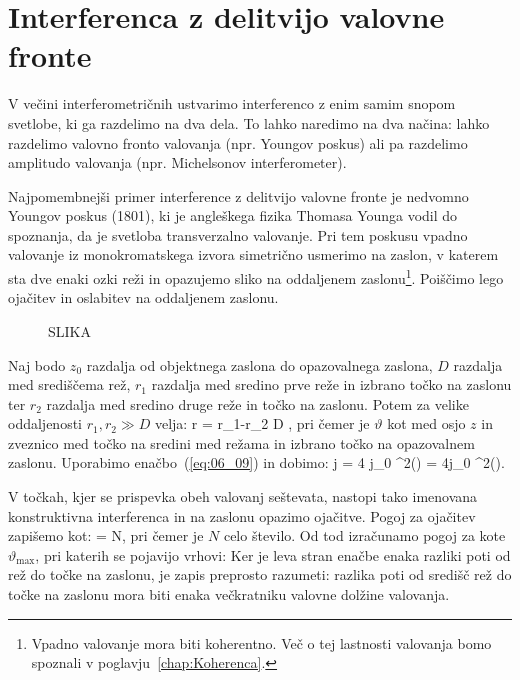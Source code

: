 \section{Interferenca z delitvijo valovne fronte}
V večini interferometričnih ustvarimo interferenco z enim samim snopom svetlobe, 
ki ga razdelimo na dva dela. To lahko naredimo na dva načina: lahko razdelimo
valovno fronto valovanja (npr. Youngov poskus) ali pa razdelimo amplitudo
valovanja (npr. Michelsonov interferometer). 

Najpomembnejši primer interference z delitvijo valovne fronte je nedvomno
Youngov poskus (1801), ki je angleškega fizika Thomasa Younga vodil do spoznanja,
da je svetloba transverzalno valovanje. Pri tem poskusu vpadno valovanje iz 
monokromatskega izvora simetrično usmerimo na zaslon, v katerem sta dve enaki ozki
reži in opazujemo sliko na oddaljenem zaslonu\footnote{Vpadno valovanje mora biti 
koherentno. Več o tej lastnosti valovanja 
bomo spoznali v poglavju~\ref{chap:Koherenca}.}. Poiščimo lego ojačitev in oslabitev
na oddaljenem zaslonu.
\begin{figure}[ht]
\centering
\def\svgwidth{120truemm} 
%
\caption{SLIKA}
\label{fig:06_Young}
\end{figure}

Naj bodo $z_0$ razdalja od objektnega zaslona do opazovalnega zaslona, $D$ razdalja 
med središčema rež, $r_1$ razdalja med sredino prve reže in izbrano točko na zaslonu
ter $r_2$ razdalja med sredino druge reže in točko na zaslonu. Potem za velike 
oddaljenosti $r_1, r_2 \gg D$ velja:
\beq
\Delta r = r_1-r_2 \approx D \sin\vartheta,
\label{eq:06_16}
\eeq
pri čemer je $\vartheta$ kot med osjo $z$ in zveznico med točko na sredini med režama in
izbrano točko na opazovalnem zaslonu. Uporabimo enačbo~(\ref{eq:06_09}) in dobimo:
\beq
j = 4 j_0 \cos^2\left(\right) = 4j_0 \cos^2\left(\right).
\label{eq:06_17}
\eeq

V točkah, kjer se prispevka obeh valovanj seštevata, nastopi tako imenovana
konstruktivna interferenca in na zaslonu opazimo ojačitve. Pogoj za ojačitev zapišemo kot:
\beq
{} = N\pi,
\label{eq:06_18}
\eeq
pri čemer je $N$ celo število. Od tod izračunamo pogoj za kote $\vartheta_\mathrm{max}$, pri katerih
se pojavijo vrhovi:
Ker je leva stran enačbe enaka razliki poti od rež do točke na zaslonu, je zapis preprosto razumeti:
razlika poti od središč rež do točke na zaslonu mora biti enaka večkratniku valovne dolžine valovanja.

